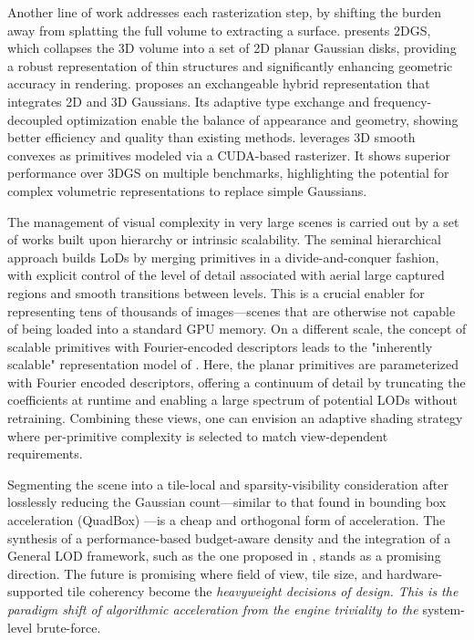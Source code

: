\documentclass[11pt,a4paper]{article}
\begin{document}
Another line of work addresses each rasterization step, by shifting the burden away from splatting the full volume to extracting a surface. \cite{arxiv:2403.17888v1} presents 2DGS, which collapses the 3D volume into a set of 2D planar Gaussian disks, providing a robust representation of thin structures and significantly enhancing geometric accuracy in rendering. \cite{arxiv:2512.02932v1} proposes an exchangeable hybrid representation that integrates 2D and 3D Gaussians. Its adaptive type exchange and frequency-decoupled optimization enable the balance of appearance and geometry, showing better efficiency and quality than existing methods. \cite{arxiv:2411.14974v3} leverages 3D smooth convexes as primitives modeled via a CUDA-based rasterizer. It shows superior performance over 3DGS on multiple benchmarks, highlighting the potential for complex volumetric representations to replace simple Gaussians.

The management of visual complexity in very large scenes is carried out by a set of works built upon hierarchy or intrinsic scalability. The seminal hierarchical approach \cite{arxiv:2406.12080v1} builds LoDs by merging primitives in a divide-and-conquer fashion, with explicit control of the level of detail associated with aerial large captured regions and smooth transitions between levels. This is a crucial enabler for representing tens of thousands of images---scenes that are otherwise not capable of being loaded into a standard GPU memory. On a different scale, the concept of scalable primitives with Fourier-encoded descriptors leads to the "inherently scalable" representation model of \cite{arxiv:2603.19834v3}. Here, the planar primitives are parameterized with Fourier encoded descriptors, offering a continuum of detail by truncating the coefficients at runtime and enabling a large spectrum of potential LODs without retraining. Combining these views, one can envision an adaptive shading strategy where per-primitive complexity is selected to match view-dependent requirements.

Segmenting the scene into a tile-local and sparsity-visibility consideration after losslessly reducing the Gaussian count---similar to that found in bounding box acceleration (QuadBox) \cite{arxiv:2605.04844v1}---is a cheap and orthogonal form of acceleration. The synthesis of a performance-based budget-aware density and the integration of a General LOD framework, such as the one proposed in \cite{arxiv:2403.19632v1}, stands as a promising direction. The future is promising where field of view, tile size, and hardware-supported tile coherency become the\emph{ heavyweight decisions of design. This is the paradigm shift of algorithmic acceleration from the engine triviality to the} system-level brute-force.
\end{document}
